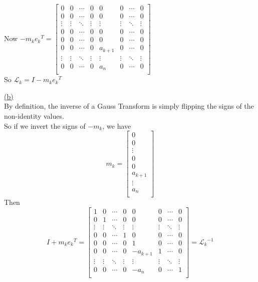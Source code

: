 \documentclass[12pt]{article}
\begin{document}
Now $-m_k {e_k}^T =
    \begin{bmatrix}
        0      & 0      & \cdots & 0      & 0       & 0      & \cdots & 0      \\
        0      & 0      & \cdots & 0      & 0       & 0      & \cdots & 0      \\
        \vdots & \vdots & \ddots & \vdots & \vdots  & \vdots & \ddots & \vdots \\
        0      & 0      & \cdots & 0      & 0       & 0      & \cdots & 0      \\
        0      & 0      & \cdots & 0      & 0       & 0      & \cdots & 0      \\
        0      & 0      & \cdots & 0      & a_{k+1} & 0      & \cdots & 0      \\
        \vdots & \vdots & \ddots & \vdots & \vdots  & \vdots & \ddots & \vdots \\
        0      & 0      & \cdots & 0      & a_{n}   & 0      & \cdots & 0      \\
    \end{bmatrix}
$\\[1cm]

So $\mathcal{L}_k = I - m_k {e_k}^T$

\newpage
\noindent \hyperlink{toc}{\hypertarget{1.2}{(b)}}\\
By definition, the inverse of a Gauss Transform is simply flipping the signs of the non-identity values. \\
So if we invert the signs of $-m_k$, we have
$$m_k =
    \begin{bmatrix}
        0       \\
        0       \\
        \vdots  \\
        0       \\
        0       \\
        a_{k+1} \\
        \vdots  \\
        a_{n}   \\
    \end{bmatrix}
$$
Then $$I + m_k {e_k}^T =
    \begin{bmatrix}
        1      & 0      & \cdots & 0      & 0        & 0      & \cdots & 0      \\
        0      & 1      & \cdots & 0      & 0        & 0      & \cdots & 0      \\
        \vdots & \vdots & \ddots & \vdots & \vdots   & \vdots & \ddots & \vdots \\
        0      & 0      & \cdots & 1      & 0        & 0      & \cdots & 0      \\
        0      & 0      & \cdots & 0      & 1        & 0      & \cdots & 0      \\
        0      & 0      & \cdots & 0      & -a_{k+1} & 1      & \cdots & 0      \\
        \vdots & \vdots & \ddots & \vdots & \vdots   & \vdots & \ddots & \vdots \\
        0      & 0      & \cdots & 0      & -a_{n}   & 0      & \cdots & 1      \\
    \end{bmatrix}
    = {\mathcal{L}_k}^{-1}$$\newpage
\end{document}
